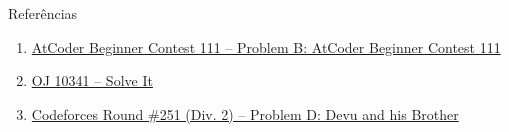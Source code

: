 \begin{frame}[fragile]{Referências}

    \begin{enumerate}
        \item \href{https://atcoder.jp/contests/abc111/tasks/abc111_b}{AtCoder Beginner
            Contest 111 -- Problem B: AtCoder Beginner Contest 111}


        \item \href{https://onlinejudge.org/index.php?option=com_onlinejudge&Itemid=8&category=24&page=show_problem&problem=1282}{OJ 10341 -- Solve It}
 
        \item \href{https://codeforces.com/problemset/problem/439/D}{Codeforces Round \#251 (Div. 2) -- Problem D: Devu and his Brother}
    \end{enumerate}

\end{frame}
